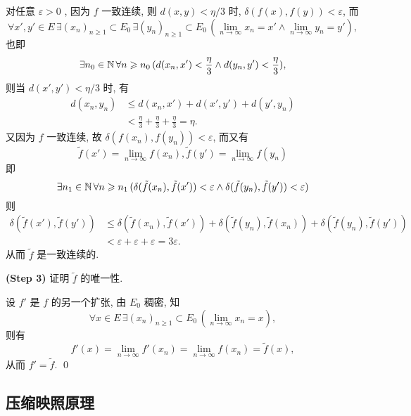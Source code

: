 \begin{Proof}
          对任意 $ \varepsilon>0 $ , 因为 $ f $ 一致连续, 则 $ d(x, y)<\eta/3 $ 时, $ \delta(f(x), f(y))<\varepsilon $, 而 
          \[
               \forall x', y'\in E\,\exists  (x_{n})_{n\geqslant1}\subset E_{0} \,\exists  (y_{n})_{n\geqslant1}\subset E_{0} \,(\lim_{n\to\infty}x_{n}=x'\land \lim_{n\to\infty}y_{n}=y' ), 
          \]  
          也即 
          \[
               \exists n_{0}\in\mathbb{N}\,\forall n\geqslant n_{0}\,(d(x_{n}, x')<\frac{\eta}{3}\land d(y_{n}, y')<\frac{\eta}{3}), 
          \] 
          则当 $ d(x', y')<\eta/3 $ 时, 有
          \[
               \begin{aligned}
                    d(x_{n}, y_{n}) & \leqslant d(x_{n}, x')+d(x', y')+d(y', y_{n})\\
                    & < \frac{\eta}{3}+\frac{\eta}{3}+\frac{\eta}{3}=\eta.
               \end{aligned}
          \]
          又因为 $ f $ 一致连续, 故 $ \delta(f(x_{n}), f(y_{n}))<\varepsilon $, 而又有
          \[
               \tilde{f}(x')=\lim_{n\to\infty}f(x_{n}), \tilde{f}(y')=\lim_{n\to\infty}f(y_{n})
          \]
          即
          \[
               \exists n_{1}\in\mathbb{N}\,\forall n\geqslant n_{1}\,(\delta(\tilde{f}(x_{n}), \tilde{f}(x'))<\varepsilon\land \delta(\tilde{f}(y_{n}), \tilde{f}(y'))<\varepsilon)
          \]
          则
          \[
               \begin{aligned}
                    \delta(\tilde{f}(x'), \tilde{f}(y')) & \leqslant \delta(\tilde{f}(x_{n}), \tilde{f}(x'))+\delta(\tilde{f}(y_{n}), \tilde{f}(x_{n}))+\delta(\tilde{f}(y_{n}), \tilde{f}(y'))\\
                    & <\varepsilon+\varepsilon+\varepsilon=3\varepsilon. 
               \end{aligned}
          \]
          从而 $ \tilde{f} $ 是一致连续的. 

          \textbf{(Step 3)} 证明 $ \tilde{f} $ 的唯一性. 

          
          设 $ {f}' $ 是 $ f $ 的另一个扩张, 由 $ E_{0} $ 稠密, 知
          \[
               \forall x\in E\,\exists (x_{n})_{n\geqslant1} \subset E_{0}\,(\lim_{n\to\infty}x_{n}=x),
          \]
          则有
          \[
               f'(x)=\lim_{n\to\infty}f'(x_{n})=\lim_{n\to\infty}f(x_{n})=\tilde{f}(x), 
          \]
          从而 $ f'=\tilde{f} $. \qed
     \end{Proof}

     \subsection{压缩映照原理}

